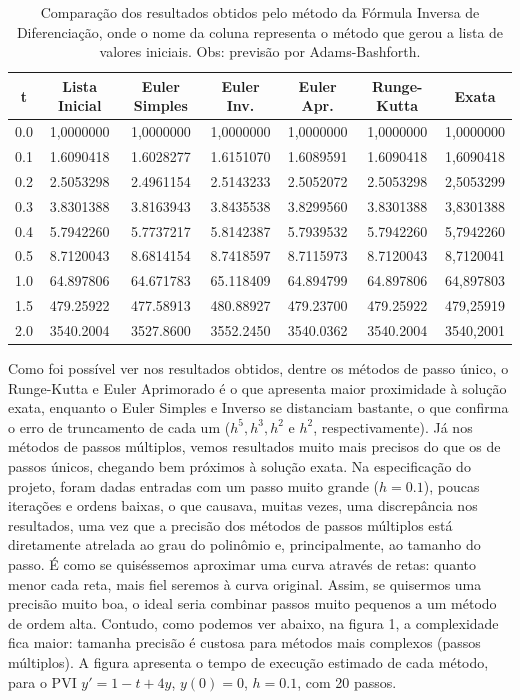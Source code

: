 \documentclass{article}
\begin{document}
\begin{otherlanguage}{brazil}
    \begin{table}[!htbp] 
    \centering
     \begin{tabular}{||c c c c c c c||}
     \hline
     t & Lista Inicial & Euler Simples & Euler Inv. & Euler Apr. & Runge-Kutta & Exata \\ [0.5ex] 
     \hline\hline
     0.0 & 1,0000000 & 1,0000000 & 1,0000000 & 1,0000000 & 1,0000000 & 1,0000000 \\
     0.1 & 1.6090418 & 1.6028277 & 1.6151070 & 1.6089591 & 1.6090418 & 1,6090418 \\ 
     0.2 & 2.5053298 & 2.4961154 & 2.5143233 & 2.5052072 & 2.5053298 & 2,5053299 \\
     0.3 & 3.8301388 & 3.8163943 & 3.8435538 & 3.8299560 & 3.8301388 & 3,8301388 \\
     0.4 & 5.7942260 & 5.7737217 & 5.8142387 & 5.7939532 & 5.7942260 & 5,7942260 \\
     0.5 & 8.7120043 & 8.6814154 & 8.7418597 & 8.7115973 & 8.7120043 & 8,7120041 \\
     1.0 & 64.897806 & 64.671783 & 65.118409 & 64.894799 & 64.897806 & 64,897803 \\
     1.5 & 479.25922 & 477.58913 & 480.88927 & 479.23700 & 479.25922 & 479,25919 \\
     2.0 & 3540.2004 & 3527.8600 & 3552.2450 & 3540.0362 & 3540.2004 & 3540,2001 \\ [1ex]
     \hline
     \end{tabular}
     \caption{Comparação dos resultados obtidos pelo método da Fórmula Inversa de Diferenciação, onde o nome da coluna representa o método que gerou a lista de valores iniciais. Obs: previsão por Adams-Bashforth.}
     \label{table:4}
    \end{table}
    
    Como foi possível ver nos resultados obtidos, dentre os métodos de passo único, o Runge-Kutta e Euler Aprimorado é o que apresenta maior proximidade à solução exata, enquanto o Euler Simples e Inverso se distanciam bastante, o que confirma o erro de truncamento de cada um ($h^5, h^3, h^2$ e $h^2$, respectivamente). Já nos métodos de passos múltiplos, vemos resultados muito mais precisos do que os de passos únicos, chegando bem próximos à solução exata. Na especificação do projeto, foram dadas entradas com um passo muito grande ($h = 0.1$), poucas iterações e ordens baixas, o que causava, muitas vezes, uma discrepância nos resultados, uma vez que a precisão dos métodos de passos múltiplos está diretamente atrelada ao grau do polinômio e, principalmente, ao tamanho do passo. É como se quiséssemos aproximar uma curva através de retas: quanto menor cada reta, mais fiel seremos à curva original. Assim, se quisermos uma precisão muito boa, o ideal seria combinar passos muito pequenos a um método de ordem alta. Contudo, como podemos ver abaixo, na figura 1, a complexidade fica maior: tamanha precisão é custosa para métodos mais complexos (passos múltiplos). A figura apresenta o tempo de execução estimado de cada método, para o PVI $y' = 1 - t + 4y$, $y(0) = 0$, $h = 0.1$, com 20 passos. 


\end{otherlanguage}
\end{document}
